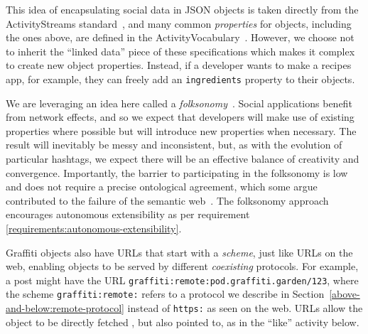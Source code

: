 This idea of encapsulating social data in JSON objects is
taken directly from the ActivityStreams standard~\cite{activitystreams},
and many common \emph{properties} for objects,
including the ones above, are defined in the
ActivityVocabulary~\cite{activityvocab}.
However, we choose not to inherit the ``linked data'' piece
of these specifications which makes it complex to create new object properties.
Instead, if a developer wants to make a recipes app, for example,
they can freely add an \texttt{ingredients} property to their objects.

We are leveraging an idea here called a \emph{folksonomy}~\cite{folksonomy}.
Social applications
benefit from network effects, and so we expect that developers will make use of
existing properties where possible
but will introduce new properties when necessary.
The result will inevitably be messy and inconsistent, but, as with the evolution of
particular hashtags, we expect there will be an effective balance of creativity and convergence.
Importantly, the barrier to participating in the folksonomy is low
and does not require a precise ontological agreement,
which some argue contributed to the failure of the semantic
web~\cite{semanticwebtwodecades}.
The folksonomy approach encourages autonomous extensibility
as per requirement \ref{requirements:autonomous-extensibility}.


Graffiti objects also have URLs that
start with a \emph{scheme}, just like URLs on the web,
enabling objects to be served by different \emph{coexisting} protocols.
For example, a post might have the URL
\texttt{graffiti:\allowbreak{}remote:\allowbreak{}pod.\allowbreak{}graffiti.\allowbreak{}garden/\allowbreak{}123},
where the scheme \texttt{graffiti:\allowbreak{}remote:} refers to a protocol we describe
in Section~\ref{above-and-below:remote-protocol}
instead of \texttt{https:} as seen on the web.
URLs allow the object to be directly fetched%
, but also pointed to, as in the
``like'' activity below.

